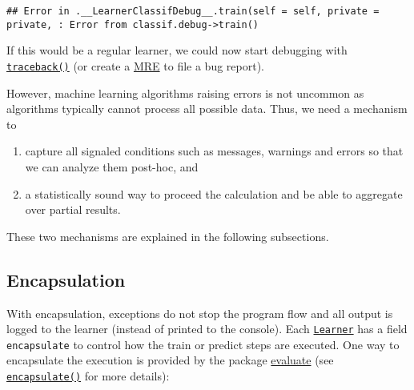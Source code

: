 \documentclass[
]{scrbook}
\newenvironment{Shaded}{\begin{snugshade}}{\end{snugshade}}
\newcommand{\AttributeTok}[1]{\textcolor[rgb]{0.77,0.63,0.00}{#1}}
\newcommand{\DecValTok}[1]{\textcolor[rgb]{0.00,0.00,0.81}{#1}}
\newcommand{\FunctionTok}[1]{\textcolor[rgb]{0.00,0.00,0.00}{#1}}
\newcommand{\NormalTok}[1]{#1}
\newcommand{\OtherTok}[1]{\textcolor[rgb]{0.56,0.35,0.01}{#1}}
\newcommand{\SpecialCharTok}[1]{\textcolor[rgb]{0.00,0.00,0.00}{#1}}
\newcommand{\StringTok}[1]{\textcolor[rgb]{0.31,0.60,0.02}{#1}}
\providecommand{\tightlist}{%
  \setlength{\itemsep}{0pt}\setlength{\parskip}{0pt}}
\renewenvironment{Shaded} {\begin{snugshade}\small} {\end{snugshade}}
\begin{document}
\begin{Shaded}
\end{Shaded}

\begin{verbatim}
## Error in .__LearnerClassifDebug__.train(self = self, private = private, : Error from classif.debug->train()
\end{verbatim}

If this would be a regular learner, we could now start debugging with \href{https://www.rdocumentation.org/packages/base/topics/traceback}{\texttt{traceback()}} (or create a \href{https://stackoverflow.com/help/minimal-reproducible-example}{MRE} to file a bug report).

However, machine learning algorithms raising errors is not uncommon as algorithms typically cannot process all possible data.
Thus, we need a mechanism to

\begin{enumerate}
\def\labelenumi{\arabic{enumi}.}
\tightlist
\item
  capture all signaled conditions such as messages, warnings and errors so that we can analyze them post-hoc, and
\item
  a statistically sound way to proceed the calculation and be able to aggregate over partial results.
\end{enumerate}

These two mechanisms are explained in the following subsections.

\hypertarget{encapsulation}{%
\subsection{Encapsulation}\label{encapsulation}}

With encapsulation, exceptions do not stop the program flow and all output is logged to the learner (instead of printed to the console).
Each \href{https://mlr3.mlr-org.com/reference/Learner.html}{\texttt{Learner}} has a field \texttt{encapsulate} to control how the train or predict steps are executed.
One way to encapsulate the execution is provided by the package \href{https://cran.r-project.org/package=evaluate}{evaluate} (see \href{https://mlr3misc.mlr-org.com/reference/encapsulate.html}{\texttt{encapsulate()}} for more details):
\end{document}
